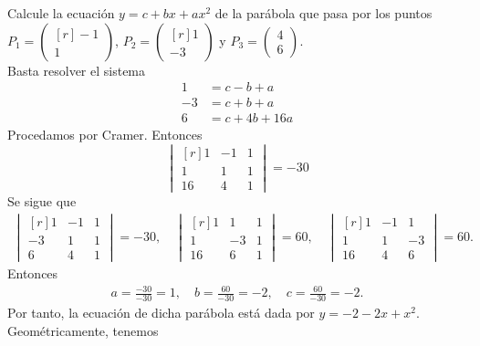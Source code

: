 \begin{example}
    Calcule la ecuación $y=c+bx+ax^2$ de la parábola que pasa por los puntos $P_1 = \begin{pmatrix*}[r]
    -1 \\
    1
\end{pmatrix*}$, $P_2 = \begin{pmatrix*}[r]
    1 \\
    -3
\end{pmatrix*}$ y $P_3 = \begin{pmatrix}
    4 \\
    6
\end{pmatrix}$. \\
    \solucion Basta resolver el sistema
    \begin{align*}
        1 &= c-b+a \\
        -3 &= c+b+a \\
        6 &=c+4b+16a
    \end{align*}
    Procedamos por Cramer. Entonces
    $$
    \begin{vmatrix*}[r]
        1 & -1 & 1 \\
        1 & 1 & 1 \\
        16 & 4 & 1
    \end{vmatrix*} = -30
    $$
    Se sigue que
    \begin{align*}
        \begin{vmatrix*}[r]
            1 & -1 & 1 \\
            -3 & 1 & 1 \\
            6 & 4 & 1
        \end{vmatrix*} =-30, \quad \begin{vmatrix*}[r]
            1 & 1 & 1 \\
            1 & -3 & 1 \\
            16 & 6 & 1
        \end{vmatrix*} =60, \quad \begin{vmatrix*}[r]
            1 & -1 & 1 \\
            1 & 1 & -3 \\
            16 & 4 & 6
        \end{vmatrix*} =60.
    \end{align*}
    Entonces
    \begin{align*}
        a =\frac{-30}{-30} =1, \quad b =\frac{60}{-30} =-2, \quad c =\frac{60}{-30} =-2.
    \end{align*}
    Por tanto, la ecuación de dicha parábola está dada por $y=-2-2x+x^2$. Geométricamente, tenemos\marginElement{\normalsize
}
\end{example}
